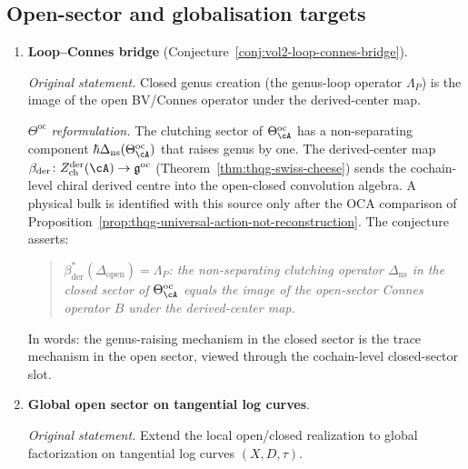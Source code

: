\subsection{Open-sector and globalisation targets}

\begin{enumerate}[resume, label=\textup{(\arabic*)}]

\item \textbf{Loop--Connes bridge}
 (Conjecture~\ref{conj:vol2-loop-connes-bridge}).

 \smallskip\noindent
 \emph{Original statement.}
 Closed genus creation (the genus-loop operator $\Lambda_P$)
 is the image of the open BV/Connes operator under the
 derived-center map.

 \smallskip\noindent
 \emph{$\Theta^{\mathrm{oc}}$ reformulation.}
 The clutching sector of $\Theta^{\mathrm{oc}}_\cA$
 has a non-separating component
 $\hbar\Delta_{\mathrm{ns}}(\Theta^{\mathrm{oc}}_\cA)$
 that raises genus by one. The derived-center map
 $\beta_{\mathrm{der}} \colon
 Z^{\mathrm{der}}_{\mathrm{ch}}(\cA) \to
 \mathfrak{g}^{\mathrm{oc}}$
 (Theorem~\ref{thm:thqg-swiss-cheese}) sends the cochain-level
 chiral derived centre into the open-closed convolution algebra. A
 physical bulk is identified with this source only after the OCA
 comparison of Proposition~\ref{prop:thqg-universal-action-not-reconstruction}.
 The
 conjecture asserts:
 \begin{quote}
 \emph{$\beta_{\mathrm{der}}^*
 (\Delta_{\mathrm{open}}) = \Lambda_P$: the non-separating
 clutching operator
 $\Delta_{\mathrm{ns}}$ in the closed sector of
 $\Theta^{\mathrm{oc}}_\cA$ equals the image of the
 open-sector Connes operator $B$ under the derived-center map.}
 \end{quote}
 In words: the genus-raising mechanism in the closed sector is
 the trace mechanism in the open sector, viewed through the
 cochain-level closed-sector slot.

\item \textbf{Global open sector on tangential log curves}.

 \smallskip\noindent
 \emph{Original statement.}
 Extend the local open/closed realization to global
 factorization on tangential log curves $(X, D, \tau)$.


\end{enumerate}
